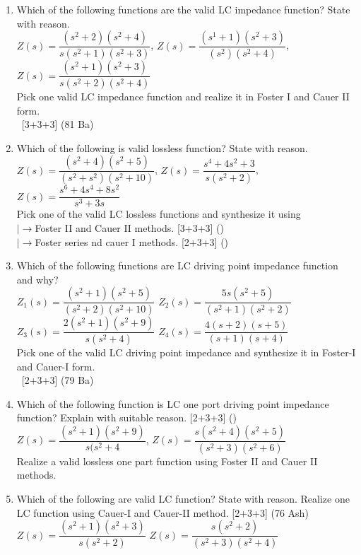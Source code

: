 \documentclass[12pt]{article}
\newcommand{\lb}{\\$\left|\rightarrow\right.$}
\newcommand{\enter}{\\\textcolor{white}{1}}
\begin{document}
\begin{enumerate}
	\item Which of the following functions are the valid LC impedance function? State with reason.\\
	$Z(s) = \dfrac{(s^2+2)(s^2+4)}{s(s^2+1)(s^2+3)}$, \hspace{1cm} $Z(s) = \dfrac{(s^1+1)(s^2+3)}{(s^2)(s^2+4)}$, \hspace{1cm} $Z(s) = \dfrac{(s^2+1)(s^2+3)}{s(s^2+2)(s^2+4)}$\\
	Pick one valid LC impedance function and realize it in Foster I and Cauer II form. 
	\enter\hfill [3+3+3] (81 Ba)
	
	\item Which of the following is valid lossless function? State with reason. \\
	$Z(s) = \dfrac{(s^2+4)(s^2+5)}{(s^2+s^2)(s^2+10)}$, \hspace{1cm} $Z(s)= \dfrac{s^4+4s^2+3}{s(s^2+2)}$, \hspace{1cm} $Z(s) = \dfrac{s^6+4s^4+8s^2}{s^3+3s}$\\
	Pick one of the valid LC lossless functions and synthesize it using
	\lb Foster II and Cauer II methods. \hfill [3+3+3] ()
	\lb Foster series nd cauer I methods. \hfill [2+3+3] ()
	
	\item Which of the following functions are LC driving point impedance function and why?\\
	$Z_1 (s)=\dfrac{(s^2+1)(s^2+5)}{(s^2+2)(s^2+10)}$ \hspace{2cm}
	$Z_2 (s)=\dfrac{5s(s^2+5)}{(s^2+1)(s^2+2)}$\\[2pt]
	$Z_3 (s)=\dfrac{2(s^2+1)(s^2+9)}{s(s^2+4)}$ \hspace{2cm}
	$Z_4 (s)=\dfrac{4(s+2)(s+5)}{(s+1)(s+4)}$\\
	Pick one of the valid LC driving point impedance and synthesize it in Foster-I and Cauer-I form.
	\enter\hfill [2+3+3] (79 Ba)
	
	\item Which of the following function is LC one port driving point impedance function? Explain with suitable reason. \hfill [2+3+3] ()\\
	$Z(s) = \dfrac{(s^2+1)(s^2+9)}{s(s^2+4}$, \hspace{2cm}
	$Z(s) = \dfrac{s(s^2+4)(s^2+5)}{(s^2+3)(s^2+6)}$\\
	Realize a valid lossless one part function using Foster II and Cauer II methods.
	
	\item Which of the following are valid LC function? State with reason. Realize one LC function using Cauer-I and Cauer-II method. \hfill [2+3+3] (76 Ash)\\
	$Z(s) = \dfrac{(s^2+1)(s^2+3)}{s(s^2+2)}$ \hspace{2cm}
	$Z(s) = \dfrac{s(s^2+2)}{(s^2+3)(s^2+4)}$
	

\end{enumerate}
\end{document}
